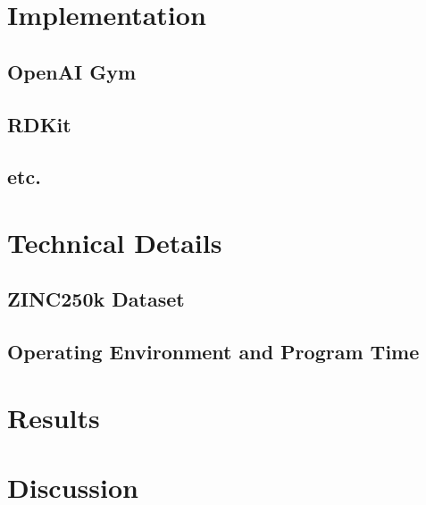 \documentclass{article}
\begin{document}
\section{Implementation}
\subsection{OpenAI Gym}
\subsection{RDKit}
\subsection{etc.}
\section{Technical Details}
\subsection{ZINC250k Dataset}
\subsection{Operating Environment and Program Time}
\section{Results}
\section{Discussion}
\end{document}
